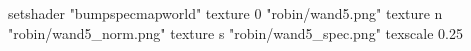 setshader "bumpspecmapworld"
   texture 0 "robin/wand5.png"
   texture n "robin/wand5_norm.png"
   texture s "robin/wand5_spec.png"
texscale 0.25